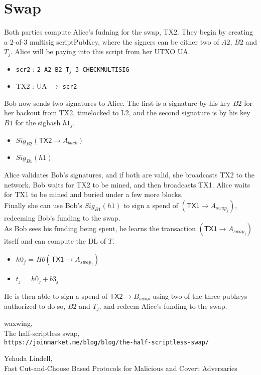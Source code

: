 \documentclass[12pt,a4paper]{article}
\begin{document}
\section{Swap}
Both parties compute Alice's fudning for the swap, TX2.  They begin by creating a 2-of-3 multisig scriptPubKey, where the signers can be either two of $A2$, $B2$ and $T_j$.  Alice will be paying into this script from her UTXO \textsf{UA}.
\begin{footnotesize}
\begin{itemize}
\item \texttt{scr2} : \texttt{2 A2 B2 T$_j$ 3 CHECKMULTISIG}
\item \textsf{TX2} : \textsf{UA} $\rightarrow$ \texttt{scr2}
\end{itemize}
\end{footnotesize}
Bob now sends two signatures to Alice.  The first is a signature by his key $B2$ for her backout from \textsf{TX2}, timelocked to \textsf{L2}, and the second signature is by his key $B1$ for the sighash $h1_j$.
\begin{footnotesize}
\begin{itemize}
\item $Sig_{B2}(\textsf{TX2} \rightarrow A_{back})$
\item $Sig_{B1}(h1)$
\end{itemize}
\end{footnotesize}
Alice validates Bob's signatures, and if both are valid, she broadcasts \textsf{TX2} to the network.  Bob waits for \textsf{TX2} to be mined, and then broadcasts \textsf{TX1}.  Alice waits for \textsf{TX1} to be mined and buried under a few more blocks.  \\
Finally she can use Bob's $Sig_{B1}(h1)$ to sign a spend of $(\textsf{TX1} \rightarrow A_{swap_j})$, redeeming Bob's funding to the swap.  \\
As Bob sees his funding being spent, he learns the transaction $(\textsf{TX1} \rightarrow A_{swap_j})$ itself and can compute the DL of $T$.
\begin{footnotesize}
\begin{itemize}
\item $h0_j$ = \emph{H0}$(\textsf{TX1} \rightarrow A_{swap_j})$
\item $t_j$ = $h0_j + b3_j$
\end{itemize}
\end{footnotesize}
He is  then able to sign a spend of $\textsf{TX2} \rightarrow B_{swap}$ using two of the three pubkeys authorized to do so, $B2$ and $T_j$, and redeem Alice's funding to the swap.
\begin{footnotesize}
\begin{thebibliography}{9}
  waxwing, \\
  The half-scriptless swap, \\
  \texttt{https://joinmarket.me/blog/blog/the-half-scriptless-swap/}

  Yehuda Lindell, \\
  Fast Cut-and-Choose Based Protocols for Malicious and Covert Adversaries
\end{thebibliography}
\end{footnotesize}
\end{document}
